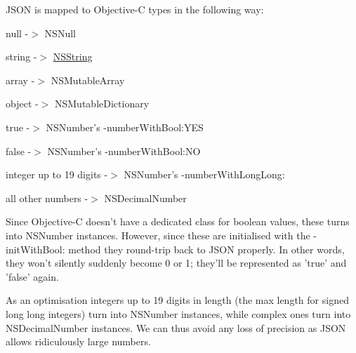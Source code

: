 \-J\-S\-O\-N is mapped to \-Objective-\/\-C types in the following way\-:

\begin{DoxyItemize}
\item null -\/$>$ \-N\-S\-Null \item string -\/$>$ \hyperlink{class_n_s_string}{\-N\-S\-String} \item array -\/$>$ \-N\-S\-Mutable\-Array \item object -\/$>$ \-N\-S\-Mutable\-Dictionary \item true -\/$>$ \-N\-S\-Number's -\/number\-With\-Bool\-:\-Y\-E\-S \item false -\/$>$ \-N\-S\-Number's -\/number\-With\-Bool\-:\-N\-O \item integer up to 19 digits -\/$>$ \-N\-S\-Number's -\/number\-With\-Long\-Long\-: \item all other numbers -\/$>$ \-N\-S\-Decimal\-Number\end{DoxyItemize}
\-Since \-Objective-\/\-C doesn't have a dedicated class for boolean values, these turns into \-N\-S\-Number instances. \-However, since these are initialised with the -\/init\-With\-Bool\-: method they round-\/trip back to \-J\-S\-O\-N properly. \-In other words, they won't silently suddenly become 0 or 1; they'll be represented as 'true' and 'false' again.

\-As an optimisation integers up to 19 digits in length (the max length for signed long long integers) turn into \-N\-S\-Number instances, while complex ones turn into \-N\-S\-Decimal\-Number instances. \-We can thus avoid any loss of precision as \-J\-S\-O\-N allows ridiculously large numbers. 